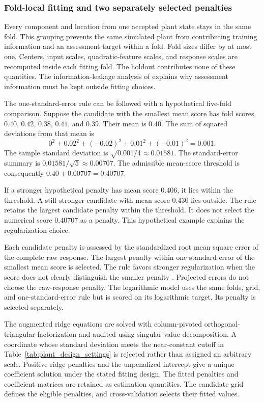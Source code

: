 \subsubsection{Fold-local fitting and two separately selected penalties}

Every component and location from one accepted plant state stays in the same fold. This grouping prevents the same simulated plant from contributing training information and an assessment target within a fold. Fold sizes differ by at most one. Centers, input scales, quadratic-feature scales, and response scales are recomputed inside each fitting fold. The holdout contributes none of these quantities. The information-leakage analysis of \citet{Kaufman2012} explains why assessment information must be kept outside fitting choices.

The one-standard-error rule can be followed with a hypothetical five-fold comparison. Suppose the candidate with the smallest mean score has fold scores $0.40$, $0.42$, $0.38$, $0.41$, and $0.39$. Their mean is 0.40. The sum of squared deviations from that mean is
\[
0^2+0.02^2+(-0.02)^2+0.01^2+(-0.01)^2=0.001.
\]
The sample standard deviation is $\sqrt{0.001/4}\approx0.01581$. The standard-error summary is $0.01581/\sqrt5\approx0.00707$. The admissible mean-score threshold is consequently $0.40+0.00707=0.40707$.

If a stronger hypothetical penalty has mean score 0.406, it lies within the threshold. A still stronger candidate with mean score 0.430 lies outside. The rule retains the largest candidate penalty within the threshold. It does not select the numerical score 0.40707 as a penalty. This hypothetical example explains the regularization choice.

Each candidate penalty is assessed by the standardized root mean square error of the complete raw response. The largest penalty within one standard error of the smallest mean score is selected. The rule favors stronger regularization when the score does not clearly distinguish the smaller penalty \citep{Hastie2009}. Projected errors do not choose the raw-response penalty. The logarithmic model uses the same folds, grid, and one-standard-error rule but is scored on its logarithmic target. Its penalty is selected separately.

The augmented ridge equations are solved with column-pivoted orthogonal-triangular factorization and audited using singular-value decomposition. A coordinate whose standard deviation meets the near-constant cutoff in Table~\ref{tab:plant_design_settings} is rejected rather than assigned an arbitrary scale. Positive ridge penalties and the unpenalized intercept give a unique coefficient solution under the stated fitting design. The fitted penalties and coefficient matrices are retained as estimation quantities. The candidate grid defines the eligible penalties, and cross-validation selects their fitted values.

